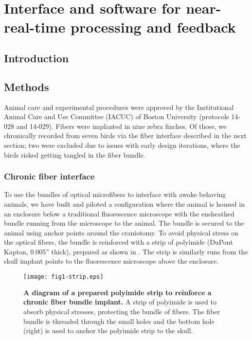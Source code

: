 \chapter{Interface and software for near-real-time processing and feedback}
\label{chapter:processing}

\thispagestyle{myheadings}

\graphicspath{{6_Processing/Figures/}}

\section{Introduction}


\section{Methods}


Animal care and experimental procedures were 
approved by the Institutional Animal Care and Use Committee (IACUC) 
of Boston University (protocols 14-028 and 14-029). Fibers were 
implanted in nine zebra finches. Of those, we chronically recorded 
from seven birds via the fiber interface described in the next section; 
two were excluded due to issues with early design iterations, 
where the birds risked getting tangled in the fiber bundle.

\subsection{Chronic fiber interface}

To use the bundles of optical microfibers to interface 
with awake behaving animals, we have built and piloted 
a configuration where the animal is housed in an enclosure 
below a traditional fluorescence microscope with the 
ensheathed bundle running from the microscope to 
the animal. The bundle is secured to the animal using 
anchor points around the craniotomy. To avoid physical 
stress on the optical fibers, the bundle is reinforced 
with a strip of polyimide (DuPont Kapton, 0.005'' thick),
prepared as shown in . The strip is 
similarly runs from the skull implant points to the 
fluorescence microscope above the enclosure.

\begin{figure}
\texttt{[image: fig1-strip.eps]}
\caption[Polyimide to reinforce fiber bundle]{\textbf{A diagram
of a prepared polyimide strip to reinforce a chronic fiber 
bundle implant.} A strip of polyimide is used to absorb physical 
stresses, protecting the bundle of fibers. The fiber bundle is 
threaded through the small holes and the bottom hole (right) is 
used to anchor the polyimide strip to the skull.}
\label{fig:strip}
\end{figure}

